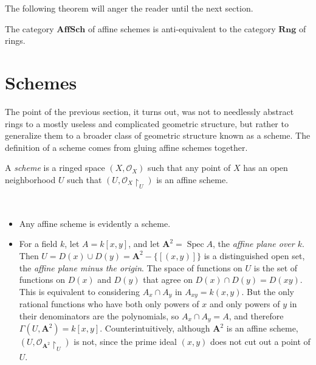 \documentclass[11pt,openany]{book} %
\newcommand{\spc}{\operatorname{Spec}}
\begin{document}
The following theorem will anger the reader until the next section.\\

\begin{theorem}
The category $\mathbf{AffSch}$ of affine schemes is anti-equivalent to the category $\mathbf{Rng}$ of rings.
\end{theorem}


\section{Schemes}
The point of the previous section, it turns out, was not to needlessly abstract rings to a mostly useless and complicated geometric structure, but rather to generalize them to a broader class of geometric structure known as a scheme. The definition of a scheme comes from gluing affine schemes together.\\

\begin{definition}
A \emph{scheme} is a ringed space $(X, \mathcal{O}_X)$ such that any point of $X$ has an open neighborhood $U$ such that $(U, \mathcal{O}_X\restriction_U)$ is an affine scheme.
\end{definition}

\begin{example}\
\begin{itemize}
	\item Any affine scheme is evidently a scheme.
    \item For a field $k$, let $A = k[x,y]$, and let $\mathbf{A}^2 = \spc A$, the \emph{affine plane over $k$}. Then $U = D(x) \cup D(y) = \mathbf{A}^2 - \{[(x,y)]\}$ is a distinguished open set, the \emph{affine plane minus the origin}. The space of functions on $U$ is the set of functions on $D(x)$ and $D(y)$ that agree on $D(x) \cap D(y) = D(xy)$. This is equivalent to considering $A_x \cap A_y$ in $A_{xy} = k(x,y)$. But the only rational functions who have both only powers of $x$ and only powers of $y$ in their denominators are the polynomials, so $A_x \cap A_y = A$, and therefore $\Gamma(U, \mathbf{A}^2) = k[x,y]$. Counterintuitively, although $\mathbf{A}^2$ is an affine scheme, $(U, \mathcal{O}_{\mathbf{A}^2}\restriction_U)$ is not, since the prime ideal $(x,y)$ does not cut out a point of $U$.
\end{itemize}
\end{example}
\end{document}
